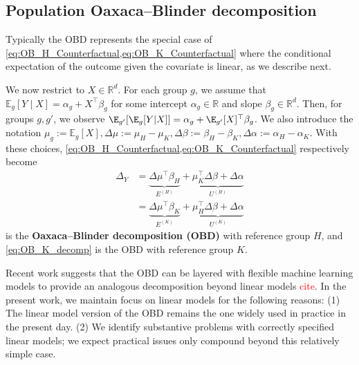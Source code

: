 \subsection{Population Oaxaca--Blinder decomposition} 
\label{sec:ob}

Typically the OBD represents the special case of \cref{eq:OB_H_Counterfactual,eq:OB_K_Counterfactual} 
where the conditional expectation of the outcome given the covariate is linear, as we describe next.

We now restrict to $X \in \mathbb{R}^d$. For each group $g$, we assume that $\mathbb{E}_g[Y \mid X] = \alpha_g + X^\top \beta_g$
for some intercept $\alpha_g \in \mathbb{R}$ and slope $\beta_g \in \mathbb{R}^d$.
Then, for groups $g,g'$, we observe $\E_{g'} [ \E_g  [ Y | X ] ] = \alpha_g + \E_{g'}[X]^\top \beta_g$.
We also introduce the notation
$\mu_g := \mathbb{E}_g[X],
\Delta \mu := \mu_H - \mu_K,
\Delta \beta := \beta_H - \beta_K,
\Delta \alpha := \alpha_H - \alpha_K.
$
With these choices,
\cref{eq:OB_H_Counterfactual,eq:OB_K_Counterfactual} respectively become
\begin{align}
    \label{eq:OB_H_decomp}
	\Delta_Y &= \underbrace{\Delta \mu^\top \beta_H}_{E^{(H)}} + \underbrace{\mu_K^\top \Delta \beta + \Delta \alpha}_{U^{(H)}} \\
    \label{eq:OB_K_decomp}
	&= \underbrace{\Delta \mu^\top \beta_K}_{E^{(K)}} + \underbrace{\mu_H^\top \Delta \beta + \Delta \alpha}_{U^{(K)}}
\end{align}
 is the \textbf{Oaxaca--Blinder decomposition (OBD)} with reference group $H$, and \cref{eq:OB_K_decomp}
is the OBD with reference group $K$.

Recent work suggests that the OBD can be layered with flexible machine learning models to provide 
an analogous decomposition beyond linear models \textcolor{red}{cite}. In the present work, we maintain focus on linear models for the following reasons:
(1) The linear model version of the OBD remains the one widely used in practice in the present day.
(2) We identify substantive problems with correctly specified linear models; we expect practical issues only compound beyond this relatively simple case.


